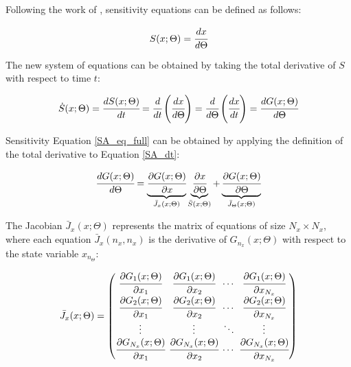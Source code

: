 \documentclass[a4paper,fleqn]{cas-dc}
\begin{document}
	Following the work of \citet{Maly1996}, sensitivity equations can be defined as follows:
	
	{\footnotesize
		\begin{equation}
			\label{SA_def}
			S(x;\Theta) = \cfrac{dx}{d\Theta}
	\end{equation} }
	
	The new system of equations can be obtained by taking the total derivative of $S$ with respect to time $t$:
	
	{\footnotesize
		\begin{equation} \label{SA_dt} 
			{\dot{S}}(x;\Theta)  = \cfrac{dS(x;\Theta)}{d t} = \cfrac{d}{d t} \left( \cfrac{dx}{d\Theta} \right) = \cfrac{d }{d\Theta} \left( \cfrac{dx}{d t} \right) = \cfrac{d G(x;\Theta)}{d\Theta} 
	\end{equation} }
	
	Sensitivity Equation \ref{SA_eq_full} can be obtained by applying the definition of the total derivative to Equation \ref{SA_dt}:
	
	{\footnotesize
		\begin{equation} \label{SA_eq_full}
			\cfrac{d G(x;\Theta)}{d \Theta} = \underbrace{ \cfrac{\partial G(x;\Theta)}{\partial x} }_{{\bar{J}_x}(x;\Theta)} \underbrace{\cfrac{\partial x}{\partial \Theta} }_{\bar{S}(x;\Theta)} + \underbrace{ \cfrac{\partial G(x;\Theta)}{\partial \Theta} }_{{\bar{J}_\Theta}(x;\Theta)}
	\end{equation} }
	
	The Jacobian ${\bar{J}_x}(x;\Theta)$ represents the matrix of equations of size $N_x \times N_x$, where each equation ${\bar{J}_x}(n_x,n_x)$ is the derivative of $G_{n_x}(x;\Theta)$ with respect to the state variable $x_{n_\Theta}$:
	
	{\footnotesize
		\begin{align}
			\begingroup %
			\setlength\arraycolsep{2pt}
			{\bar{J}_x}(x;\Theta)=\begin{pmatrix}
				\cfrac{\partial {G_{1}}(x;\Theta)}{\partial {x_{1}}} & \cfrac{\partial {G_{1}}(x;\Theta)}{\partial {x_{2}}} & \cdots & \cfrac{\partial {G_{1}}(x;\Theta)}{\partial {x_{N_x}}}\\
				\cfrac{\partial {G_{2}}(x;\Theta)}{\partial {x_{1}}} & \cfrac{\partial {G_{2}}(x;\Theta)}{\partial {x_{2}}} & \cdots & \cfrac{\partial {G_{2}}(x;\Theta)}{\partial {x_{N_x}}}\\
				\vdots & \vdots & \ddots & \vdots\\ 
				\cfrac{\partial {G_{N_x}}(x;\Theta)}{\partial {x_{1}}} & \cfrac{\partial {G_{N_x}}(x;\Theta)}{\partial {x_{2}}} & \cdots & \cfrac{\partial {G_{N_x}}(x;\Theta)}{\partial {x_{N_x}}}\\
			\end{pmatrix}
			\endgroup
	\end{align} }
	
\end{document}
